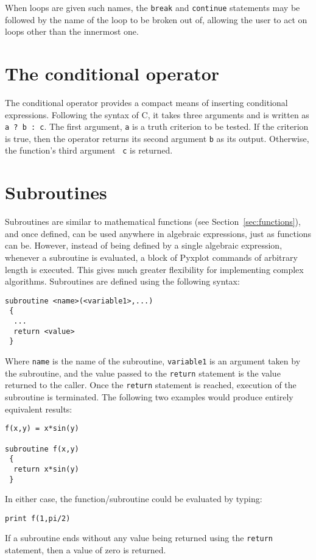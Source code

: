 \noindent When loops are given such names, the {\tt break} and {\tt continue}
statements may be followed by the name of the loop to be broken out of,
allowing the user to act on loops other than the innermost one.

\section{The conditional operator}
\label{sec:conditional_operator}

The conditional operator provides a compact means of inserting conditional
expressions.  Following the syntax of C, it takes three arguments and is
written as {\tt a ? b : c}. The first argument, {\tt a} is a truth criterion to
be tested. If the criterion is true, then the operator returns its second
argument {\tt b} as its output. Otherwise, the function's third argument {\tt
c} is returned.

\vspace{2mm}


\section{Subroutines}
\label{sec:subroutines}

Subroutines are similar to mathematical functions (see
Section~\ref{sec:functions}), and once defined, can be used anywhere in
algebraic expressions, just as functions can be.  However, instead of being
defined by a single algebraic expression, whenever a subroutine is evaluated, a
block of Pyxplot commands of arbitrary length is executed. This gives much
greater flexibility for implementing complex algorithms. Subroutines are
defined using the following syntax:
\begin{verbatim}
subroutine <name>(<variable1>,...)
 {
  ...
  return <value>
 }
\end{verbatim}
Where {\tt name} is the name of the subroutine, {\tt variable1} is an argument
taken by the subroutine, and the value passed to the {\tt return} statement is
the value returned to the caller. Once the {\tt return} statement is reached,
execution of the subroutine is terminated. The following two examples would
produce entirely equivalent results:
\begin{verbatim}
f(x,y) = x*sin(y)

subroutine f(x,y)
 {
  return x*sin(y)
 }
\end{verbatim}
In either case, the function/subroutine could be evaluated by typing:
\begin{verbatim}
print f(1,pi/2)
\end{verbatim}
If a subroutine ends without any value being returned using the {\tt return}
statement, then a value of zero is returned.


